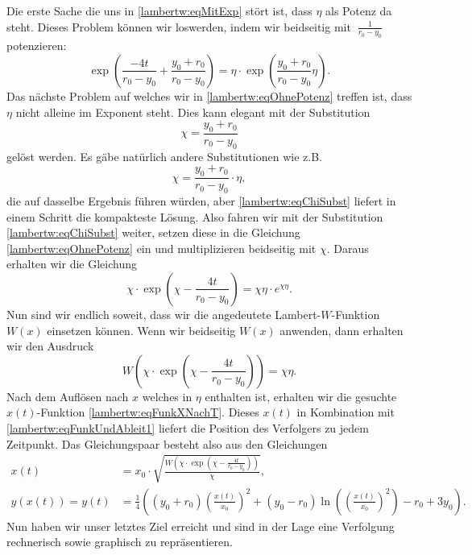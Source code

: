 Die erste Sache die uns in \eqref{lambertw:eqMitExp} stört ist, dass \(\eta\) als Potenz da steht. Dieses Problem können wir loswerden, indem wir beidseitig mit \(\:\displaystyle \frac{1}{r_0-y_0}\:\) potenzieren:
\begin{equation}
	\operatorname{exp}\left(\displaystyle \frac{-4t}{r_0-y_0}+\frac{y_0+r_0}{r_0-y_0}\right)
	=
	\eta\cdot \operatorname{exp}\left(\displaystyle \frac{y_0+r_0}{r_0-y_0}\eta\right).
	\label{lambertw:eqOhnePotenz}
\end{equation}
Das nächste Problem auf welches wir in \eqref{lambertw:eqOhnePotenz} treffen ist, dass \(\eta\) nicht alleine im Exponent steht. Dies kann elegant mit der Substitution 
\begin{equation}
	\chi
	=
	\frac{y_0+r_0}{r_0-y_0}
	\label{lambertw:eqChiSubst}
\end{equation}
gelöst werden.
Es gäbe natürlich andere Substitutionen wie z.B. 
\[\displaystyle \chi=\frac{y_0+r_0}{r_0-y_0}\cdot\eta,\] 
die auf dasselbe Ergebnis führen würden, aber \eqref{lambertw:eqChiSubst} liefert in einem Schritt die kompakteste Lösung. Also fahren wir mit der Substitution \eqref{lambertw:eqChiSubst} weiter, setzen diese in die Gleichung \eqref{lambertw:eqOhnePotenz} ein und multiplizieren beidseitig mit \(\chi\). Daraus erhalten wir die Gleichung
\begin{equation}
	\chi\cdot \operatorname{exp}\left(\displaystyle \chi-\frac{4t}{r_0-y_0}\right)
	=
	\chi\eta\cdot e^{\displaystyle \chi\eta}.
	\label{lambertw:eqNachSubst}
\end{equation}
Nun sind wir endlich soweit, dass wir die angedeutete Lambert-\(W\)-Funktion \(W(x)\) einsetzen können. Wenn wir beidseitig \(W(x)\) anwenden, dann erhalten wir den Ausdruck
\begin{equation}
	W\left(\chi\cdot \operatorname{exp}\left(\displaystyle \chi-\frac{4t}{r_0-y_0}\right)\right)
	=
	\chi\eta.
\end{equation}
Nach dem Auflösen nach \(x\) welches in \(\eta\) enthalten ist, erhalten wir die gesuchte \(x(t)\)-Funktion \eqref{lambertw:eqFunkXNachT}. Dieses \(x(t)\) in Kombination mit \eqref{lambertw:eqFunkUndAbleit1} liefert die Position des Verfolgers zu jedem Zeitpunkt. Das Gleichungspaar besteht also aus den Gleichungen
\begin{subequations}
	\label{lambertw:eqFunktionenNachT}
	\begin{align}
		\label{lambertw:eqFunkXNachT}
		x(t)
		&=
		x_0\cdot\sqrt{\frac{W\left(\chi\cdot \operatorname{exp}\left(\displaystyle \chi-\frac{4t}{r_0-y_0}\right)\right)}{\chi}}, \\
		\label{lambertw:eqFunkYNachT}
		y(x(t))
		=
		y(t)
		&=
		\frac{1}{4}\left(\left(y_0+r_0\right)\left(\frac{x(t)}{x_0}\right)^2+\left(y_0-r_0\right)\operatorname{ln}\left(\left(\frac{x(t)}{x_0}\right)^2\right)-r_0+3y_0\right).
	\end{align}
\end{subequations}
Nun haben wir unser letztes Ziel erreicht und sind in der Lage eine Verfolgung rechnerisch sowie graphisch zu repräsentieren.

